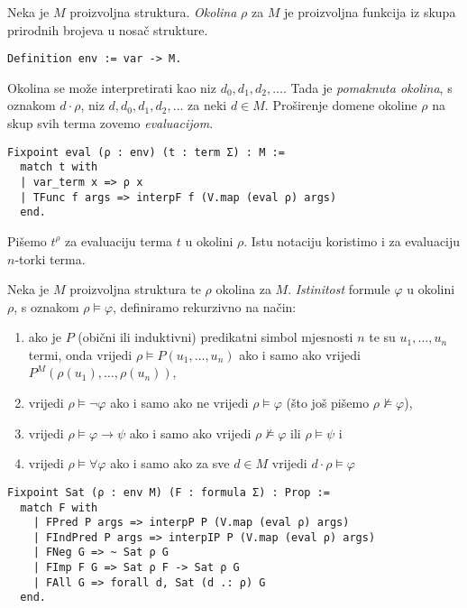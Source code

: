 \begin{definition}
  Neka je \(M\) proizvoljna struktura. \textit{Okolina} \(\rho\) za \(M\) je proizvoljna funkcija iz skupa prirodnih brojeva u nosač strukture.
\begin{verbatim}
Definition env := var -> M.
\end{verbatim}
  \noindent Okolina se može interpretirati kao niz \(d_{0}, d_{1}, d_{2}, \ldots\). Tada je \textit{pomaknuta okolina}, s oznakom \(d \cdot \rho\),
  niz \(d, d_{0}, d_{1}, d_{2}, \ldots\) za neki \(d \in M\).
  \noindent Proširenje domene okoline \(\rho\) na skup svih terma zovemo \textit{evaluacijom}.
\begin{verbatim}
Fixpoint eval (ρ : env) (t : term Σ) : M :=
  match t with
  | var_term x => ρ x
  | TFunc f args => interpF f (V.map (eval ρ) args)
  end.
\end{verbatim}
  Pišemo \(t^{\rho}\) za evaluaciju terma \(t\) u okolini \(\rho\).
  Istu notaciju koristimo i za evaluaciju \(n\)-torki terma.
\end{definition}

\begin{definition}
  Neka je \(M\) proizvoljna struktura te \(\rho\) okolina za \(M\).
  \textit{Istinitost} formule \(\varphi\) u okolini \(\rho\), s oznakom \(\rho \vDash \varphi\),
  definiramo rekurzivno na način:
  \begin{enumerate}
  \item ako je \(P\) (obični ili induktivni) predikatni simbol mjesnosti \(n\)
    te su \(u_{1}, \ldots, u_{n}\) termi,
    onda vrijedi \(\rho \vDash P(u_{1}, \ldots, u_{n})\) ako i samo ako vrijedi \(P^{M}(\rho(u_{1}), \ldots, \rho(u_{n}))\),
  \item vrijedi \(\rho \vDash \neg \varphi \) ako i samo ako ne vrijedi \(\rho \vDash \varphi\) (što još pišemo \(\rho \not \vDash \varphi\)),
  \item vrijedi \(\rho \vDash \varphi \rightarrow \psi \) ako i samo ako vrijedi \(\rho \not \vDash \varphi\) ili \(\rho \vDash \psi\) i
  \item vrijedi \(\rho \vDash \forall \varphi\) ako i samo ako za sve \(d \in M\) vrijedi \(d \cdot \rho \vDash \varphi\)
  \end{enumerate}
\begin{verbatim}
Fixpoint Sat (ρ : env M) (F : formula Σ) : Prop :=
  match F with
    | FPred P args => interpP P (V.map (eval ρ) args)
    | FIndPred P args => interpIP P (V.map (eval ρ) args)
    | FNeg G => ~ Sat ρ G
    | FImp F G => Sat ρ F -> Sat ρ G
    | FAll G => forall d, Sat (d .: ρ) G
  end.
\end{verbatim}
\end{definition}

